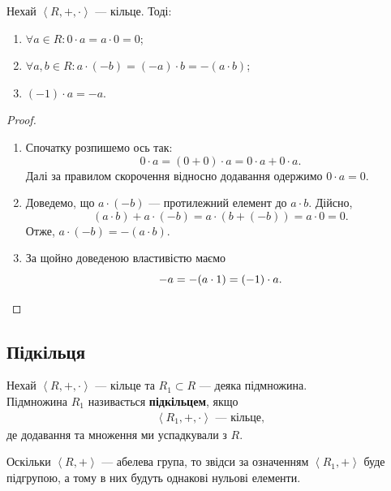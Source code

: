 \documentclass{math_library}
\begin{document}
\begin{proposition}[Властивості]
Нехай $\left<R,+,\cdot \right>$ --- кільце. Тоді:
\begin{enumerate}[nosep, wide=0pt, label={\arabic*)}]
\item $\forall a \in R: 0 \cdot a = a \cdot 0 = 0$;
\item $\forall a,b \in R: a \cdot (-b) = (-a) \cdot b = -(a \cdot b)$;
\item $(-1) \cdot a = -a$.
\end{enumerate}
\end{proposition}

\begin{proof}
\begin{enumerate}[topsep=0pt, wide=0pt, label={\arabic*)}]
\item Спочатку розпишемо ось так:
\[
0 \cdot a = (0 + 0) \cdot a = 0 \cdot a + 0 \cdot a.
\]
Далі за правилом скорочення відносно додавання одержимо $0 \cdot a = 0$.

\item Доведемо, що $a \cdot (-b)$ --- протилежний елемент до $a \cdot b$. Дійсно,
\[
(a \cdot b) + a \cdot (-b) = a \cdot (b + (-b)) = a \cdot 0 = 0.
\]
Отже, $a \cdot (-b) = -(a \cdot b)$.

\item За щойно доведеною властивістю маємо
\[
-a = -(a \cdot 1) = (-1) \cdot a. \qedhere
\]
\end{enumerate}
\end{proof}

\subsection{Підкільця}
\begin{definition}
Нехай $\left<R,+, \cdot \right>$ --- кільце та $R_1 \subset R$ --- деяка підмножина.\\
Підмножина $R_1$ називається \textbf{підкільцем}, якщо 
\begin{align*}
\left<R_1,+,\cdot \right> \text{ --- кільце},
\end{align*}
де додавання та множення ми успадкували з $R$.
\end{definition}

\begin{remark}
Оскільки $\left< R,+\right>$ --- абелева група, то звідси за означенням $\left< R_1,+\right>$ буде підгрупою, а тому в них будуть однакові нульові елементи.
\end{remark}
\end{document}
